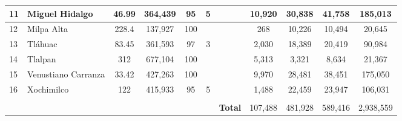 \begin{landscape}
\begin{table}[]
{\begin{tabular}{llcccllcccc}
\multicolumn{1}{|l|}{11} & \multicolumn{1}{l|}{Miguel Hidalgo} & \multicolumn{1}{c|}{46.99} & \multicolumn{1}{c|}{364,439} & \multicolumn{1}{c|}{95} & \multicolumn{1}{c|}{5} & \multicolumn{1}{l|}{} & \multicolumn{1}{c|}{10,920} & \multicolumn{1}{c|}{30,838} & \multicolumn{1}{c|}{41,758} & \multicolumn{1}{c|}{185,013} \\ \hline
\multicolumn{1}{|l|}{12} & \multicolumn{1}{l|}{Milpa Alta} & \multicolumn{1}{c|}{228.4} & \multicolumn{1}{c|}{137,927} & \multicolumn{1}{c|}{100} & \multicolumn{1}{l|}{} & \multicolumn{1}{l|}{} & \multicolumn{1}{c|}{268} & \multicolumn{1}{c|}{10,226} & \multicolumn{1}{c|}{10,494} & \multicolumn{1}{c|}{20,645} \\ \hline
\multicolumn{1}{|l|}{13} & \multicolumn{1}{l|}{Tláhuac} & \multicolumn{1}{c|}{83.45} & \multicolumn{1}{c|}{361,593} & \multicolumn{1}{c|}{97} & \multicolumn{1}{c|}{3} & \multicolumn{1}{l|}{} & \multicolumn{1}{c|}{2,030} & \multicolumn{1}{c|}{18,389} & \multicolumn{1}{c|}{20,419} & \multicolumn{1}{c|}{90,984} \\ \hline
\multicolumn{1}{|l|}{14} & \multicolumn{1}{l|}{Tlalpan} & \multicolumn{1}{c|}{312} & \multicolumn{1}{c|}{677,104} & \multicolumn{1}{c|}{100} & \multicolumn{1}{l|}{} & \multicolumn{1}{l|}{} & \multicolumn{1}{c|}{5,313} & \multicolumn{1}{c|}{3,321} & \multicolumn{1}{c|}{8,634} & \multicolumn{1}{c|}{21,367} \\ \hline
\multicolumn{1}{|l|}{15} & \multicolumn{1}{l|}{Venustiano Carranza} & \multicolumn{1}{c|}{33.42} & \multicolumn{1}{c|}{427,263} & \multicolumn{1}{c|}{100} & \multicolumn{1}{l|}{} & \multicolumn{1}{l|}{} & \multicolumn{1}{c|}{9,970} & \multicolumn{1}{c|}{28,481} & \multicolumn{1}{c|}{38,451} & \multicolumn{1}{c|}{175,050} \\ \hline
\multicolumn{1}{|l|}{16} & \multicolumn{1}{l|}{Xochimilco} & \multicolumn{1}{c|}{122} & \multicolumn{1}{c|}{415,933} & \multicolumn{1}{c|}{95} & \multicolumn{1}{c|}{5} & \multicolumn{1}{l|}{} & \multicolumn{1}{c|}{1,488} & \multicolumn{1}{c|}{22,459} & \multicolumn{1}{c|}{23,947} & \multicolumn{1}{c|}{106,031} \\ \hline
 &  & \multicolumn{1}{l}{} & \multicolumn{1}{l}{} & \multicolumn{1}{l}{} &  &  & \multicolumn{1}{l}{} & \multicolumn{1}{l}{} & \multicolumn{1}{l}{} & \multicolumn{1}{l}{} \\ \cline{7-11} 
 &  & \multicolumn{1}{l}{} & \multicolumn{1}{l}{} & \multicolumn{1}{l}{} & \multicolumn{1}{l|}{} & \multicolumn{1}{c|}{\textbf{Total}} & \multicolumn{1}{c|}{107,488} & \multicolumn{1}{c|}{481,928} & \multicolumn{1}{c|}{589,416} & \multicolumn{1}{c|}{2,938,559} \\ \cline{7-11} 
\end{tabular}
}
\end{table}
\end{landscape}

